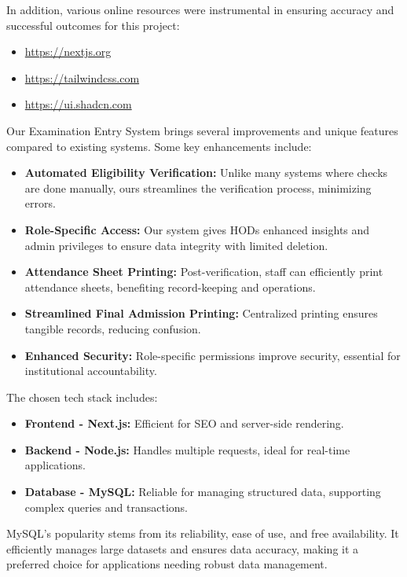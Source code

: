 \documentclass[12pt]{article}
\begin{document}
In addition, various online resources were instrumental in ensuring accuracy and successful outcomes for this project:
\begin{itemize}
    \item \url{https://nextjs.org}
    \item \url{https://tailwindcss.com}
    \item \url{https://ui.shadcn.com}
\end{itemize}

Our Examination Entry System brings several improvements and unique features compared to existing systems. Some key enhancements include:

\begin{itemize}
    \item \textbf{Automated Eligibility Verification:} Unlike many systems where checks are done manually, ours streamlines the verification process, minimizing errors.
    \item \textbf{Role-Specific Access:} Our system gives HODs enhanced insights and admin privileges to ensure data integrity with limited deletion.
    \item \textbf{Attendance Sheet Printing:} Post-verification, staff can efficiently print attendance sheets, benefiting record-keeping and operations.
    \item \textbf{Streamlined Final Admission Printing:} Centralized printing ensures tangible records, reducing confusion.
    \item \textbf{Enhanced Security:} Role-specific permissions improve security, essential for institutional accountability.
\end{itemize}

The chosen tech stack includes:
\begin{itemize}
    \item \textbf{Frontend - Next.js:} Efficient for SEO and server-side rendering.
    \item \textbf{Backend - Node.js:} Handles multiple requests, ideal for real-time applications.
    \item \textbf{Database - MySQL:} Reliable for managing structured data, supporting complex queries and transactions.
\end{itemize}

MySQL’s popularity stems from its reliability, ease of use, and free availability. It efficiently manages large datasets and ensures data accuracy, making it a preferred choice for applications needing robust data management.
\end{document}
